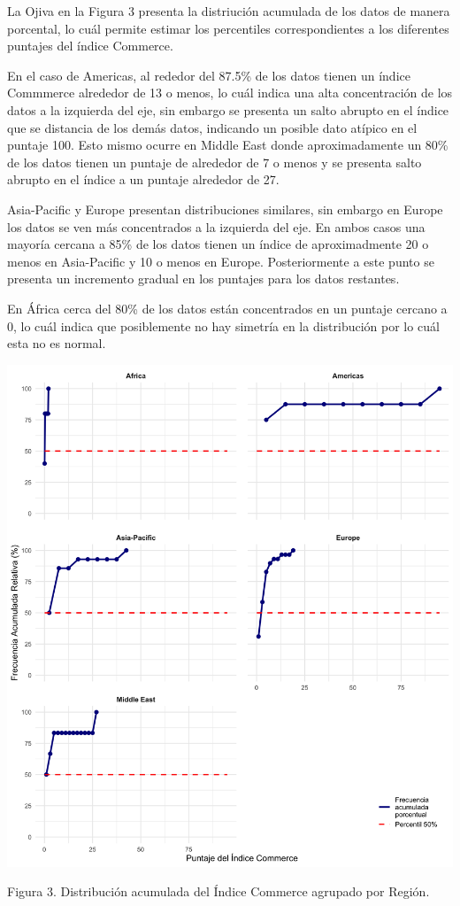 \documentclass[
]{article}
\begin{document}
\begin{multicols}{2}
La Ojiva en la Figura 3 presenta la distriución acumulada de los datos de manera porcental, lo cuál permite estimar los percentiles correspondientes a los diferentes puntajes del índice Commerce.

En el caso de Americas, al rededor del 87.5\% de los datos tienen un índice Commmerce alrededor de 13 o menos, lo cuál indica una alta concentración de los datos a la izquierda del eje, sin embargo se presenta un salto abrupto en el índice que se distancia de los demás datos, indicando un posible dato atípico en el puntaje 100. Esto mismo ocurre en Middle East donde aproximadamente un 80\% de los datos tienen un puntaje de alrededor de 7 o menos y se presenta salto abrupto en el índice a un puntaje alrededor de 27.

Asia-Pacific y Europe presentan distribuciones similares, sin embargo en Europe los datos se ven más concentrados a la izquierda del eje. En ambos casos una mayoría cercana a 85\% de los datos tienen un índice de aproximadmente 20 o menos en Asia-Pacific y 10 o menos en Europe. Posteriormente a este punto se presenta un incremento gradual en los puntajes para los datos restantes.

En África cerca del 80\% de los datos están concentrados en un puntaje cercano a 0, lo cuál indica que posiblemente no hay simetría en la distribución por lo cuál esta no es normal.




\begin{center}
\includegraphics[width=\linewidth]{figura3.png}
\end{center}
Figura 3. Distribución acumulada del Índice Commerce agrupado por Región.



\end{multicols}
\end{document}
